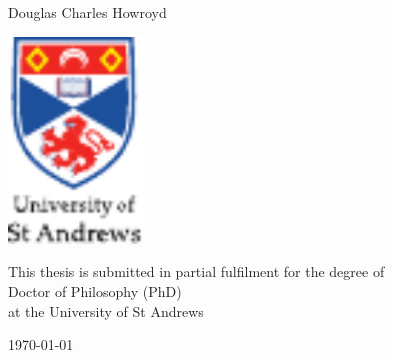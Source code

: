 \begin{titlepage}
  \centering

  \null
  \vspace{2em}

  {\Huge \textbf{\printtitle} \par}
  \vspace{7em}

  {\huge Douglas Charles Howroyd}
  \vspace{6em}

  \includegraphics[height=14.8em,keepaspectratio,clip=true]{pics/arms}
  \vspace{6em}

  {\large \doublespacing
    This thesis is submitted in partial fulfilment for the degree of\\
    Doctor of Philosophy (PhD)\\
    at the University of St Andrews \par}
  \vspace{7em}

  \UKvardate
  {\Large \today}
\end{titlepage}
